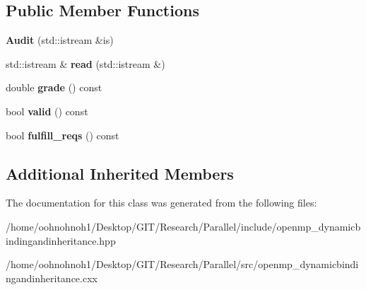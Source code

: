 \subsection*{Public Member Functions}
\begin{DoxyCompactItemize}
\item 
\mbox{\label{classAudit_ade00f5809cf66ccdbcc9067e5b8a1fed}} 
{\bfseries Audit} (std\+::istream \&is)
\item 
\mbox{\label{classAudit_a1be7070bbeb90a465588f72791a23875}} 
std\+::istream \& {\bfseries read} (std\+::istream \&)
\item 
\mbox{\label{classAudit_a9e0ac89e1a2f1a36b3d37788ebec88f7}} 
double {\bfseries grade} () const
\item 
\mbox{\label{classAudit_a88378e2e72af376f5ff11ae5f41dfdfe}} 
bool {\bfseries valid} () const
\item 
\mbox{\label{classAudit_a3c9e02a58c0204f281c574fcd53cab55}} 
bool {\bfseries fulfill\+\_\+reqs} () const
\end{DoxyCompactItemize}
\subsection*{Additional Inherited Members}


The documentation for this class was generated from the following files\+:\begin{DoxyCompactItemize}
\item 
/home/oohnohnoh1/\+Desktop/\+G\+I\+T/\+Research/\+Parallel/include/openmp\+\_\+dynamicbindingandinheritance.\+hpp\item 
/home/oohnohnoh1/\+Desktop/\+G\+I\+T/\+Research/\+Parallel/src/openmp\+\_\+dynamicbindingandinheritance.\+cxx\end{DoxyCompactItemize}
